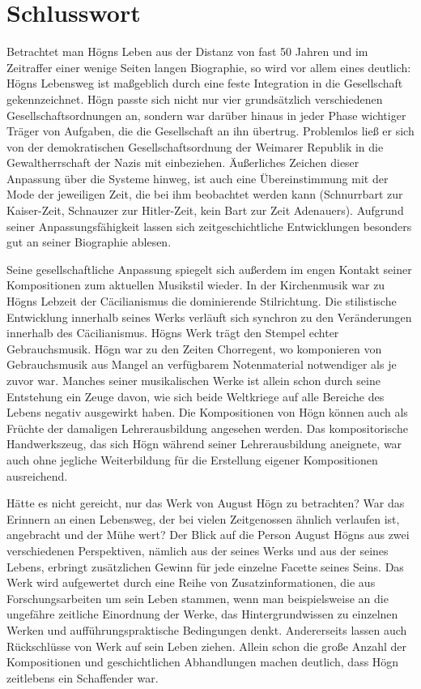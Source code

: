 \documentclass[a4paper]{article}
\begin{document}
\section{Schlusswort}
\hypertarget{RefHeadingToc100333756}{}Betrachtet man Högns Leben aus der
Distanz von fast 50 Jahren und im Zeitraffer einer wenige Seiten langen
Biographie, so wird vor allem eines deutlich: Högns Lebensweg ist
maßgeblich durch eine feste Integration in die Gesellschaft
gekennzeichnet. Högn passte sich nicht nur vier grundsätzlich
verschiedenen Gesellschaftsordnungen an, sondern war darüber hinaus in
jeder Phase wichtiger Träger von Aufgaben, die die Gesellschaft an ihn
übertrug. Problemlos ließ er sich von der demokratischen
Gesellschaftsordnung der Weimarer Republik in die Gewaltherrschaft der
Nazis mit einbeziehen. Äußerliches Zeichen dieser Anpassung über die
Systeme hinweg, ist auch eine Übereinstimmung mit der Mode der
jeweiligen Zeit, die bei ihm beobachtet werden kann (Schnurrbart zur
Kaiser-Zeit, Schnauzer zur Hitler-Zeit, kein Bart zur Zeit Adenauers).
Aufgrund seiner Anpassungsfähigkeit lassen sich zeitgeschichtliche
Entwicklungen besonders gut an seiner Biographie ablesen.

Seine gesellschaftliche Anpassung spiegelt sich außerdem im engen
Kontakt seiner Kompositionen zum aktuellen Musikstil wieder. In der
Kirchenmusik war zu Högns Lebzeit der Cäcilianismus die dominierende
Stilrichtung. Die stilistische Entwicklung innerhalb seines Werks
verläuft sich synchron zu den Veränderungen innerhalb des
Cäcilianismus. Högns Werk trägt den Stempel echter Gebrauchsmusik. Högn
war zu den Zeiten Chorregent, wo komponieren von Gebrauchsmusik aus
Mangel an verfügbarem Notenmaterial notwendiger als je zuvor war.
Manches seiner musikalischen Werke ist allein schon durch seine
Entstehung ein Zeuge davon, wie sich beide Weltkriege auf alle Bereiche
des Lebens negativ ausgewirkt haben. Die Kompositionen von Högn können
auch als Früchte der damaligen Lehrerausbildung angesehen werden. Das
kompositorische Handwerkszeug, das sich Högn während seiner
Lehrerausbildung aneignete, war auch ohne jegliche Weiterbildung für
die Erstellung eigener Kompositionen ausreichend.

Hätte es nicht gereicht, nur das Werk von August Högn zu betrachten? War
das Erinnern an einen Lebensweg, der bei vielen Zeitgenossen ähnlich
verlaufen ist, angebracht und der Mühe wert? Der Blick auf die Person
August Högns aus zwei verschiedenen Perspektiven, nämlich aus der
seines Werks und aus der seines Lebens, erbringt zusätzlichen Gewinn
für jede einzelne Facette seines Seins. Das Werk wird aufgewertet durch
eine Reihe von Zusatzinformationen, die aus Forschungsarbeiten um sein
Leben stammen, wenn man beispielsweise an die ungefähre zeitliche
Einordnung der Werke, das Hintergrundwissen zu einzelnen Werken und
aufführungspraktische Bedingungen denkt. Andererseits lassen auch
Rückschlüsse von Werk auf sein Leben ziehen. Allein schon die große
Anzahl der Kompositionen und geschichtlichen Abhandlungen machen
deutlich, dass Högn zeitlebens ein Schaffender war.
\end{document}
